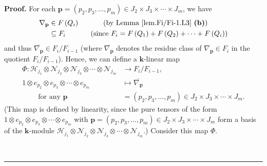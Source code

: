\documentclass[numbers=enddot,12pt,final,onecolumn,notitlepage]{scrartcl}%
\theoremstyle{definition}
\newenvironment{proof}[1][Proof]{\noindent\textbf{#1.} }{\ \rule{0.5em}{0.5em}}
\begin{document}
\begin{proof}
For each $\mathbf{p}=\left(  p_{2},p_{3},\ldots,p_{m}\right)  \in J_{2}\times
J_{3}\times\cdots\times J_{m}$, we have%
\begin{align*}
\nabla_{\mathbf{p}}  &  \in F\left(  Q_{i}\right)  \ \ \ \ \ \ \ \ \ \ \left(
\text{by Lemma \ref{lem.Fi/Fi-1.L3} \textbf{(b)}}\right) \\
&  \subseteq F_{i}\ \ \ \ \ \ \ \ \ \ \left(  \text{since }F_{i}=F\left(
Q_{1}\right)  +F\left(  Q_{2}\right)  +\cdots+F\left(  Q_{i}\right)  \right)
\end{align*}
and thus $\overline{\nabla_{\mathbf{p}}}\in F_{i}/F_{i-1}$ (where
$\overline{\nabla_{\mathbf{p}}}$ denotes the residue class of $\nabla
_{\mathbf{p}}\in F_{i}$ in the quotient $F_{i}/F_{i-1}$). Hence, we can define
a $\mathbf{k}$-linear map%
\begin{align*}
\Phi:\mathcal{H}_{j_{1}}\otimes\mathcal{N}_{j_{2}}\otimes\mathcal{N}_{j_{3}%
}\otimes\cdots\otimes\mathcal{N}_{j_{m}}  &  \rightarrow F_{i}/F_{i-1},\\
1\otimes e_{p_{2}}\otimes e_{p_{3}}\otimes\cdots\otimes e_{p_{m}}  &
\mapsto\overline{\nabla_{\mathbf{p}}}\\
\ \ \ \ \ \ \ \ \ \ \text{for any }\mathbf{p}  &  =\left(  p_{2},p_{3}%
,\ldots,p_{m}\right)  \in J_{2}\times J_{3}\times\cdots\times J_{m}.
\end{align*}
(This map is defined by linearity, since the pure tensors of the form
$1\otimes e_{p_{2}}\otimes e_{p_{3}}\otimes\cdots\otimes e_{p_{m}}$ with
$\mathbf{p}=\left(  p_{2},p_{3},\ldots,p_{m}\right)  \in J_{2}\times
J_{3}\times\cdots\times J_{m}$ form a basis of the $\mathbf{k}$-module
$\mathcal{H}_{j_{1}}\otimes\mathcal{N}_{j_{2}}\otimes\mathcal{N}_{j_{3}%
}\otimes\cdots\otimes\mathcal{N}_{j_{m}}$.) Consider this map $\Phi$.


\end{proof}
\end{document}
